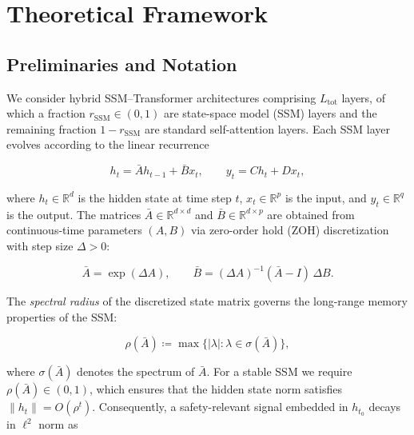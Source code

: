\documentclass{article}
\newcommand{\rSSM}{r_{\mathrm{SSM}}}
\begin{document}

\section{Theoretical Framework}
\label{sec:theory}

\subsection{Preliminaries and Notation}
\label{sec:prelim}

We consider hybrid SSM--Transformer architectures comprising $L_{\text{tot}}$ layers, of which a fraction $\rSSM \in (0,1)$ are state-space model (SSM) layers and the remaining fraction $1 - \rSSM$ are standard self-attention layers. Each SSM layer evolves according to the linear recurrence

\begin{equation}
    h_t = \bar{A} h_{t-1} + \bar{B} x_t, \qquad y_t = C h_t + D x_t,
    \label{eq:ssm-recurrence-formal}
\end{equation}

\noindent where $h_t \in \mathbb{R}^d$ is the hidden state at time step $t$, $x_t \in \mathbb{R}^p$ is the input, and $y_t \in \mathbb{R}^q$ is the output. The matrices $\bar{A} \in \mathbb{R}^{d \times d}$ and $\bar{B} \in \mathbb{R}^{d \times p}$ are obtained from continuous-time parameters $(A, B)$ via zero-order hold (ZOH) discretization with step size $\Delta > 0$:

\begin{equation}
    \bar{A} = \exp(\Delta A), \qquad \bar{B} = (\Delta A)^{-1}(\bar{A} - I)\,\Delta B.
    \label{eq:zoh-formal}
\end{equation}

\noindent The \emph{spectral radius} of the discretized state matrix governs the long-range memory properties of the SSM:

\begin{equation}
    \rho(\bar{A}) \coloneqq \max\bigl\{|\lambda| : \lambda \in \sigma(\bar{A})\bigr\},
    \label{eq:spectral-radius-formal}
\end{equation}

\noindent where $\sigma(\bar{A})$ denotes the spectrum of $\bar{A}$. For a stable SSM we require $\rho(\bar{A}) \in (0, 1)$, which ensures that the hidden state norm satisfies $\|h_t\| = O(\rho^t)$. Consequently, a safety-relevant signal embedded in $h_{t_0}$ decays in $\ell^2$ norm as
\end{document}
